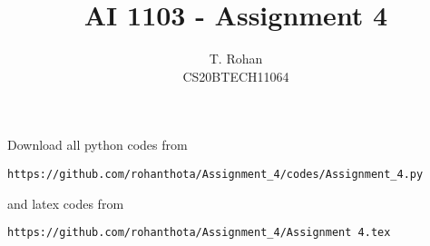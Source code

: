 \documentclass[journal,12pt,twocolumn]{IEEEtran}
\DeclareMathOperator*{\Res}{Res}
\begin{document}
\newcommand{\BEQA}{\begin{eqnarray}}
\newcommand{\EEQA}{\end{eqnarray}}
\newcommand{\define}{\stackrel{\triangle}{=}}

\raggedbottom
\setlength{\parindent}{0pt}
\providecommand{\mbf}{\mathbf}
\providecommand{\pr}[1]{\ensuremath{\Pr\left(#1\right)}}
\providecommand{\qfunc}[1]{\ensuremath{Q\left(#1\right)}}
\providecommand{\sbrak}[1]{\ensuremath{{}\left[#1\right]}}
\providecommand{\lsbrak}[1]{\ensuremath{{}\left[#1\right.}}
\providecommand{\rsbrak}[1]{\ensuremath{{}\left.#1\right]}}
\providecommand{\brak}[1]{\ensuremath{\left(#1\right)}}
\providecommand{\lbrak}[1]{\ensuremath{\left(#1\right.}}
\providecommand{\rbrak}[1]{\ensuremath{\left.#1\right)}}
\providecommand{\cbrak}[1]{\ensuremath{\left\{#1\right\}}}
\providecommand{\lcbrak}[1]{\ensuremath{\left\{#1\right.}}
\providecommand{\rcbrak}[1]{\ensuremath{\left.#1\right\}}}
\theoremstyle{remark}
\newtheorem{rem}{Remark}
\newcommand{\sgn}{\mathop{\mathrm{sgn}}}
\providecommand{\abs}[1]{\vert#1\vert}
\providecommand{\res}[1]{\Res\displaylimits_{#1}} 
\providecommand{\norm}[1]{\lVert#1\rVert}
\providecommand{\mtx}[1]{\mathbf{#1}}
\providecommand{\mean}[1]{E[ #1 ]}
\providecommand{\fourier}{\overset{\mathcal{F}}{ \rightleftharpoons}}
\providecommand{\system}{\overset{\mathcal{H}}{ \longleftrightarrow}}
\newcommand{\solution}{\noindent \textbf{Solution: }}
\newcommand{\cosec}{\,\text{cosec}\,}
\providecommand{\dec}[2]{\ensuremath{\overset{#1}{\underset{#2}{\gtrless}}}}
\newcommand{\myvec}[1]{\ensuremath{\begin{pmatrix}#1\end{pmatrix}}}
\newcommand{\mydet}[1]{\ensuremath{\begin{vmatrix}#1\end{vmatrix}}}
\makeatletter
{}
\makeatother
\let\StandardTheFigure\thefigure
\let\vec\mathbf
\renewcommand{\thefigure}{\theproblem}
\def\putbox#1#2#3{\makebox[0in][l]{\makebox[#1][l]{}\raisebox{\baselineskip}[0in][0in]{\raisebox{#2}[0in][0in]{#3}}}}
     \def\rightbox#1{\makebox[0in][r]{#1}}
     \def\centbox#1{\makebox[0in]{#1}}
     \def\topbox#1{\raisebox{-\baselineskip}[0in][0in]{#1}}
     \def\midbox#1{\raisebox{-0.5\baselineskip}[0in][0in]{#1}}
\vspace{3cm}
\title{AI 1103 - Assignment 4}
\author{T. Rohan \\ CS20BTECH11064}
\maketitle
\newpage
\bigskip
\renewcommand{\thefigure}{\theenumi}
\renewcommand{\thetable}{\theenumi}
Download all python codes from 
\begin{lstlisting}
https://github.com/rohanthota/Assignment_4/codes/Assignment_4.py
\end{lstlisting}
%
and latex codes from
%
\begin{lstlisting}
https://github.com/rohanthota/Assignment_4/Assignment 4.tex
\end{lstlisting}
\end{document}
